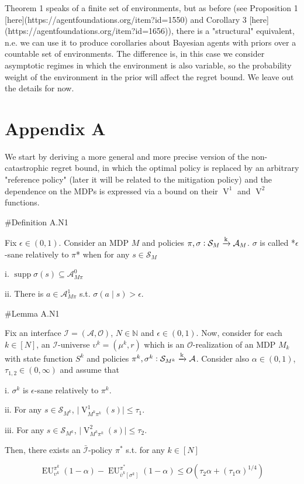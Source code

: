 \documentclass[a4paper]{article}
\DeclareMathOperator{\Supp}{supp}
\newcommand{\AP}[1]{\left(#1\right)}
\newcommand{\AB}[1]{\left[#1\right]}
\newcommand{\Nats}{\mathbb{N}}
\newcommand{\Abs}[1]{\lvert #1 \rvert}
\newcommand{\M}{\xrightarrow{\textnormal{k}}}
\newcommand{\Ob}{\mathcal{O}}
\newcommand{\A}{\mathcal{A}}
\newcommand{\St}{\mathcal{S}}
\newcommand{\In}{\mathcal{I}}
\newcommand{\Adi}{{\bar{\In}}}
\newcommand{\V}{\operatorname{V}}
\newcommand{\EU}{\operatorname{EU}}
\begin{document}
Theorem 1 speaks of a finite set of environments, but as before (see Proposition 1 [here](https://agentfoundations.org/item?id=1550) and Corollary 3 [here](https://agentfoundations.org/item?id=1656)), there is a "structural" equivalent, n.e. we can use it to produce corollaries about Bayesian agents with priors over a countable set of environments. The difference is, in this case we consider asymptotic regimes in which the environment is also variable, so the probability weight of the environment in the prior will affect the regret bound. We leave out the details for now.

\section{Appendix A}

We start by deriving a more general and more precise version of the non-catastrophic regret bound, in which the optimal policy is replaced by an arbitrary "reference policy" (later it will be related to the mitigation policy) and the dependence on the MDPs is expressed via a bound on their $\V^1$ and $\V^2$ functions.

\#Definition A.N1

Fix $\epsilon\in(0,1)$. Consider an MDP $M$ and policies $\pi,\sigma: \St_M \M \A_M$. $\sigma$ is called *$\epsilon$-sane relatively to $\pi$* when for any $s \in \St_M$

i. $\Supp{\sigma(s)} \subseteq \A_{M\pi}^0$

ii. There is $a \in \A_{M\pi}^1$ s.t. $\sigma(a \mid s) > \epsilon$.

\#Lemma A.N1

Fix an interface $\In=(\A,\Ob)$, $N \in \Nats$ and $\epsilon \in (0,1)$. Now, consider for each $k \in [N]$, an $\In$-universe $\upsilon^k=(\mu^k,r)$ which is an $\Ob$-realization of an MDP $M_k$ with state function $S^k$ and policies $\pi^k,\sigma^k: \St_{M^k} \M \A$. Consider also $\alpha\in(0,1)$, $\tau_{1,2} \in (0,\infty)$ and assume that 

i. $\sigma^k$ is $\epsilon$-sane relatively to $\pi^k$.

ii. For any $s \in \St_{M^k}$, $\Abs{\V^1_{M^k\pi^k}(s)} \leq \tau_1$.

iii. For any $s \in \St_{M^k}$, $\Abs{\V^2_{M^k\pi^k}(s)} \leq \tau_2$.

Then, there exists an $\Adi$-policy $\pi^*$ s.t. for any $k \in [N]$

$$\EU_{\upsilon^k}^{\pi^k}(1-\alpha) - \EU_{\bar{\upsilon}^k\AB{\sigma^k}}^{\pi^*}(1-\alpha) \leq O\AP{\tau_2 \alpha + (\tau_1 \alpha)^{1/4}}$$
\end{document}
